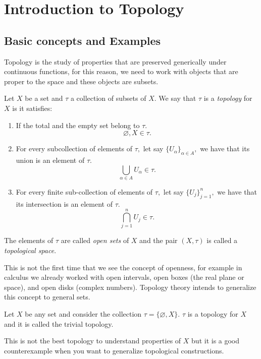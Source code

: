 \documentclass[
	fontsize=10pt, %
	twoside=false, %
	secnumdepth=1, %
]{kaobook}
\begin{document}
\chapter{Introduction to Topology}



\section{Basic concepts and Examples}

Topology is the study of properties that are preserved generically under continuous functions, for this reason, we need to work with objects that are proper to the space and these objects are subsets.

\begin{definition}
Let $X$ be a set and $\tau$ a collection of subsets of $X.$ We say that $\tau$ is a \emph{topology} for $X$ is it satisfies:
\begin{enumerate}
\item If the total and the empty set belong to $\tau.$ $$\varnothing, X\in\tau.$$

\item For every subcollection of elements of $\tau,$ let say $\{U_\alpha\}_{\alpha\in A},$ we have that its union is an element of $\tau.$ $$\bigcup_{\alpha \in A} U_\alpha \in \tau.$$

\item For every finite sub-collection of elements of $\tau,$ let say $\{U_j\}_{j=1}^n,$ we have that its intersection is an element of $\tau.$ $$ \bigcap_{j=1}^n U_j\in\tau.$$
\end{enumerate}

The elements of $\tau$ are called \emph{open sets} of $X$ and the pair $(X,\tau)$ is called a \emph{topological space}.
\end{definition}

This is not the first time that we see the concept of openness, for example in calculus we already worked with open intervals, open boxes (the real plane or space), and open disks (complex numbers). Topology theory intends to generalize this concept to general sets.

\begin{example}
Let $X$ be any set and consider the collection $\tau=\{\varnothing, X\}.$ $\tau$ is a topology for $X$ and it is called the trivial topology. 

This is not the best topology to understand properties of $X$ but it is a good counterexample when you want to generalize topological constructions.
\end{example}
\end{document}
